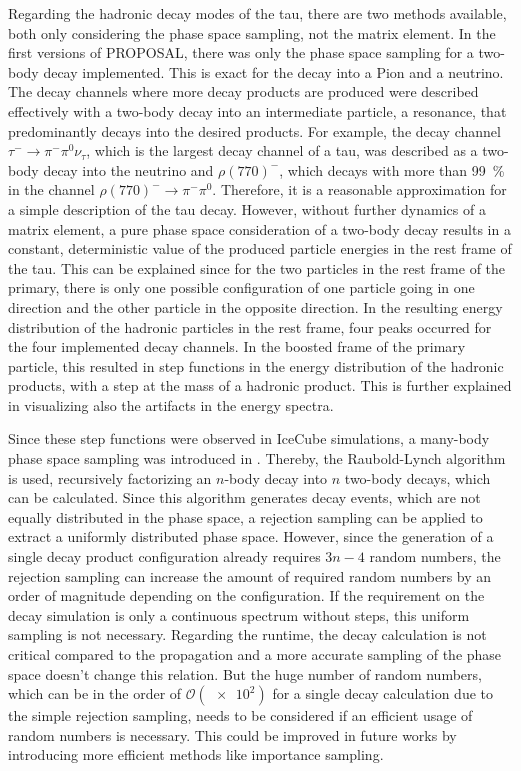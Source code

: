 Regarding the hadronic decay modes of the tau, there are two methods available, both only considering the phase space sampling, not the matrix element.
In the first versions of PROPOSAL, there was only the phase space sampling for a two-body decay implemented.
This is exact for the decay into a Pion and a neutrino.
The decay channels where more decay products are produced were described effectively with a two-body decay into an intermediate particle, a resonance, that predominantly decays into the desired products.
For example, the decay channel $\tau^- \to \pi^- \pi^0 \nu_\tau$, which is the largest decay channel of a tau, was described as a two-body decay into the neutrino and $\rho(770)^-$, which decays with more than \SI{99}{\%} in the channel  $\rho(770)^- \to \pi^- \pi^0$.
Therefore, it is a reasonable approximation for a simple description of the tau decay.
However, without further dynamics of a matrix element, a pure phase space consideration of a two-body decay results in a constant, deterministic value of the produced particle energies in the rest frame of the tau.
This can be explained since for the two particles in the rest frame of the primary, there is only one possible configuration of one particle going in one direction and the other particle in the opposite direction.
In the resulting energy distribution of the hadronic particles in the rest frame, four peaks occurred for the four implemented decay channels.
In the boosted frame of the primary particle, this resulted in step functions in the energy distribution of the hadronic products, with a step at the mass of a hadronic product.
This is further explained in \cite{Dunsch19PROPOSAL} visualizing also the artifacts in the energy spectra.

Since these step functions were observed in IceCube simulations, a many-body phase space sampling was introduced in \cite{Dunsch18Master}.
Thereby, the Raubold-Lynch algorithm is used, recursively factorizing an $n$-body decay into $n$ two-body decays, which can be calculated.
Since this algorithm generates decay events, which are not equally distributed in the phase space, a rejection sampling can be applied to extract a uniformly distributed phase space.
However, since the generation of a single decay product configuration already requires $3n - 4$ random numbers, the rejection sampling can increase the amount of required random numbers by an order of magnitude depending on the configuration.
If the requirement on the decay simulation is only a continuous spectrum without steps, this uniform sampling is not necessary.
Regarding the runtime, the decay calculation is not critical compared to the propagation and a more accurate sampling of the phase space doesn't change this relation.
But the huge number of random numbers, which can be in the order of $\mathcal{O}(\num{e2})$ for a single decay calculation due to the simple rejection sampling, needs to be considered if an efficient usage of random numbers is necessary.
This could be improved in future works by introducing more efficient methods like importance sampling.

